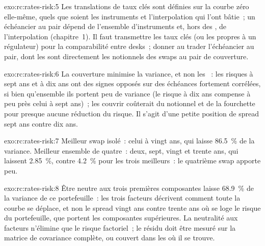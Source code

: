 \begin{solution}{exo:rc:rates-risk:5}
Les translations de taux clés sont définies sur la courbe zéro elle-même, quels que soient les instruments et
l'interpolation qui l'ont bâtie~; un échéancier au pair dépend de l'ensemble d'instruments et, hors
des , de l'interpolation (chapitre~1). Il faut transmettre les taux clés (ou les
 propres à un régulateur) pour la comparabilité entre desks~; donner au trader l'échéancier au pair, dont les
 sont directement les notionnels des swaps au pair de couverture.
\end{solution}

\begin{solution}{exo:rc:rates-risk:6}
La couverture minimise la variance, et non les ~: les risques à sept ans et à dix ans ont
des signes opposés sur des échéances fortement corrélées, si bien qu'ensemble ils portent peu
de variance (le risque à dix ans compense à peu près celui à sept ans)~; les couvrir coûterait
du notionnel et de la fourchette pour presque aucune réduction du risque. Il s'agit d'une petite
position de spread sept ans contre dix ans.
\end{solution}

\begin{solution}{exo:rc:rates-risk:7}
Meilleur swap isolé~: celui à vingt ans, qui laisse 86.5~\% de la variance. Meilleur
ensemble de quatre~: deux, sept, vingt et trente ans, qui laissent 2.85~\%, contre 4.2~\%
pour les trois meilleurs~: le quatrième swap apporte peu.
\end{solution}

\begin{solution}{exo:rc:rates-risk:8}
Être neutre aux trois premières composantes laisse 68.9~\% de la variance de ce
portefeuille~: les trois facteurs décrivent comment toute la courbe se déplace, et non le
spread vingt ans contre trente ans où se loge le risque du portefeuille, que portent les
composantes supérieures. La neutralité aux facteurs n'élimine que le risque factoriel~; le résidu doit
être mesuré sur la matrice de covariance complète, ou couvert dans les  où il se trouve.
\end{solution}

